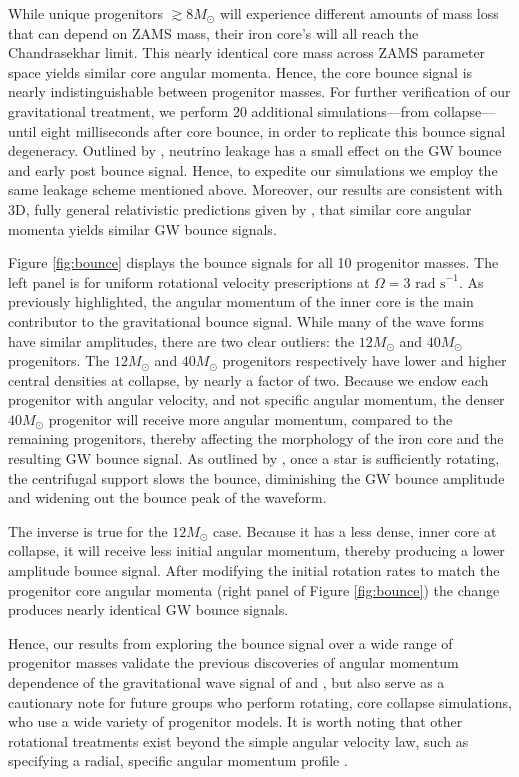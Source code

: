 \documentclass[twocolumn,times]{aastex62}  %
\begin{document}
While unique progenitors $\gtrsim 8 M_\odot$ will experience different amounts of mass loss that can depend on ZAMS mass,  their iron core's will all reach the Chandrasekhar limit.  This nearly identical core mass across ZAMS parameter space yields similar core angular momenta.  Hence, the core bounce signal is nearly indistinguishable between progenitor masses.  For further verification of our gravitational treatment, we perform 20 additional simulations---from collapse---until eight milliseconds after core bounce, in order to replicate this bounce signal degeneracy.  Outlined by \citet{ott:2012}, neutrino leakage has a small effect on the GW bounce and early post bounce signal.  Hence, to expedite our simulations we employ the same leakage scheme mentioned above.  Moreover, our results are consistent with 3D, fully general relativistic predictions given by \citet{ott:2012}, that similar core angular momenta yields similar GW bounce signals.  

Figure \ref{fig:bounce} displays the bounce signals for all 10 progenitor masses.  The left panel is for uniform rotational velocity prescriptions at $\Omega = 3\text{ rad s}^{-1}$.  As previously highlighted, the angular momentum of the inner core is the main contributor to the gravitational bounce signal.  While many of the wave forms have similar amplitudes, there are two clear outliers: the $12 M_\odot$ and $40 M_\odot$ progenitors.  The $12 M_\odot$ and $40 M_\odot$ progenitors respectively have lower and higher central densities at collapse, by nearly a factor of two.  Because we endow each progenitor with angular velocity, and not specific angular momentum, the denser $40 M_\odot$ progenitor will receive more angular momentum, compared to the remaining progenitors, thereby affecting the morphology of the iron core and the resulting GW bounce signal.  As outlined by \citet{dimm:2008}, once a star is sufficiently rotating, the centrifugal support slows the bounce, diminishing the GW bounce amplitude and widening out the bounce peak of the waveform.  

The inverse is true for the $12 M_\odot$ case.  Because it has a less dense, inner core at collapse, it will receive less initial angular momentum, thereby producing a lower amplitude bounce signal.  After modifying the initial rotation rates to match the progenitor core angular momenta (right panel of Figure \ref{fig:bounce}) the change produces nearly identical GW bounce signals.  

Hence, our results from exploring the bounce signal over a wide range of progenitor masses validate the previous discoveries of angular momentum dependence of the gravitational wave signal of \citet{dimm:2008} and \citet{abdik:2010,abdik:2014}, but also serve as a cautionary note for future groups who perform rotating, core collapse simulations, who use a wide variety of progenitor models.  It is worth noting that other rotational treatments exist beyond the simple angular velocity law, such as specifying a radial, specific angular momentum profile \citep[eg.][]{oconnor:2011}.  
\end{document}
